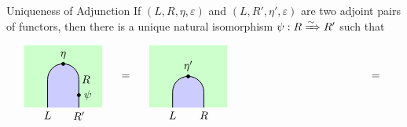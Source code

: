 \begin{proposition}{Uniqueness of Adjunction}{}
    If $\left(L,R,\eta,\varepsilon\right)$ and $\left(L,R',\eta', \varepsilon\right)$ are two adjoint pairs of functors, then there is a unique natural isomorphism $\psi:R\xRightarrow{\sim} R'$ such that 
    \[
        \begin{tikzpicture}[x=0.5cm,y=0.5cm,line width=0.7pt,hollow/.style={
                   circle,
                   fill=white,
                   draw,
                   outer sep=0pt,
                   inner sep=1.7pt,
                   line width=0.7pt
                 }]
           \definecolor{leftcolor}{RGB}{204, 255, 204}
           \definecolor{midcolor}{RGB}{204, 204, 255}
           
       
           \node at (4, 2) {$=$};
          \node at (20, 2) {$=$};
           
           
            \begin{scope}
               \begin{scope} 
                   \clip (-2.5,0) rectangle (2.5, 4);     
                   \fill[fill=leftcolor] (-3,0) rectangle (3, 4);  
                    
                   \draw[fill=midcolor, rounded corners=0.5cm, line width=0.7pt] (-1, -2) rectangle (1, 2.8);
               \end{scope}
             
               \filldraw [black] (1,0.8) circle (0.1) node[right=1pt] {$\psi$};
               \node[below] at (-1, 0) {$L$};
               \node[right=-1pt] at (1, 1.8) {$R$};
               \node[below] at (1, 0) {$R'$};
               \draw[fill=black] (0, 2.8) circle (0.1);
               \node[above=1pt] at (0, 2.8) {$\eta$}; 
             
           \end{scope}
           
           \begin{scope}[shift={(8,0)}]
               \begin{scope} 
                   \clip (-2.5,0) rectangle (2.5, 4); 
                   \fill[fill=leftcolor] (-3,0) rectangle (3, 4);  
                   \draw[fill=midcolor, rounded corners=0.5cm, line width=0.7pt] (-1, -2) rectangle (1, 2);
               \end{scope}
               \node[below] at (-1, 0) {$L$};
               \node[below] at (1, 0) {$R$};
               \draw[fill=black] (0, 2) circle (0.1);
               \node[above=1pt] at (0, 2) {$\eta'$}; 
           

\end{scope}
\end{tikzpicture}\]
\end{proposition}
